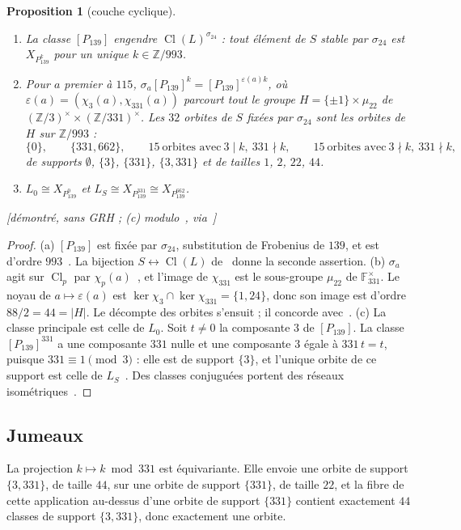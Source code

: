 \documentclass[11pt,a4paper]{amsart}
\theoremstyle{plain}
\newtheorem{proposition}{Proposition}[section]
\theoremstyle{definition}
\newcommand{\Z}{\mathbb{Z}}
\newcommand{\F}{\mathbb{F}}
\DeclareMathOperator{\Cl}{Cl}
\newcommand{\Lz}{L_{0}}
\newcommand{\LS}{L_{S}}
\newcommand{\st}[1]{\textup{\textsf{\small[#1]}}}
\begin{document}
\begin{proposition}[couche cyclique]\label{prop:cyclic}
\begin{enumerate}[label=\textup{(\alph*)}]
\item La classe $[P_{139}]$ engendre $\Cl(L)^{\sigma_{24}}$ : tout élément de $S$ stable par $\sigma_{24}$ est $X_{P_{139}^k}$ pour un unique $k\in\Z/993$.
\item Pour $a$ premier à $115$, $\sigma_a[P_{139}]^k=[P_{139}]^{\varepsilon(a)k}$, où $\varepsilon(a)=(\chi_3(a),\chi_{331}(a))$ parcourt tout le groupe $H=\{\pm1\}\times\mu_{22}$ de $(\Z/3)^\times\times(\Z/331)^\times$. Les $32$ orbites de $S$ fixées par $\sigma_{24}$ sont les orbites de $H$ sur $\Z/993$ :
\[
\{0\},\qquad\{331,662\},\qquad 15\ \text{orbites avec}\ 3\mid k,\ 331\nmid k,\qquad 15\ \text{orbites avec}\ 3\nmid k,\ 331\nmid k,
\]
de supports $\emptyset$, $\{3\}$, $\{331\}$, $\{3,331\}$ et de tailles $1$, $2$, $22$, $44$.
\item $\Lz\cong X_{P_{139}^{0}}$ et $\LS\cong X_{P_{139}^{331}}\cong X_{P_{139}^{662}}$.
\end{enumerate}
\st{démontré, sans GRH ; (c) modulo~\cite[rem.~3.11, lemme~A.9]{Sak26}, via~\cite[prop.~2.7]{Gau26}}
\end{proposition}

\begin{proof}
(a) $[P_{139}]$ est fixée par $\sigma_{24}$, substitution de Frobenius de $139$, et est d'ordre $993$~\cite[rem.~6.8(a)]{Gau26}. La bijection $S\leftrightarrow\Cl(L)$ de~\cite[prop.~2.3]{Gau26} donne la seconde assertion.
(b) $\sigma_a$ agit sur $\Cl_p$ par $\chi_p(a)$~\cite[prop.~2.5]{Gau26}, et l'image de $\chi_{331}$ est le sous-groupe $\mu_{22}$ de $\F_{331}^\times$. Le noyau de $a\mapsto\varepsilon(a)$ est $\ker\chi_3\cap\ker\chi_{331}=\{1,24\}$, donc son image est d'ordre $88/2=44=|H|$. Le décompte des orbites s'ensuit ; il concorde avec~\cite[tableau~1]{Gau26}.
(c) La classe principale est celle de $\Lz$. Soit $t\ne0$ la composante $3$ de $[P_{139}]$. La classe $[P_{139}]^{331}$ a une composante $331$ nulle et une composante $3$ égale à $331\,t=t$, puisque $331\equiv1\pmod3$ : elle est de support $\{3\}$, et l'unique orbite de ce support est celle de $\LS$~\cite[prop.~2.7(b)]{Gau26}. Des classes conjuguées portent des réseaux isométriques~\cite[\S2.1]{Gau26}.
\end{proof}

\subsection{Jumeaux}
La projection $k\mapsto k\bmod331$ est équivariante. Elle envoie une orbite de support $\{3,331\}$, de taille $44$, sur une orbite de support $\{331\}$, de taille $22$, et la fibre de cette application au-dessus d'une orbite de support $\{331\}$ contient exactement $44$ classes de support $\{3,331\}$, donc exactement une orbite.
\end{document}
